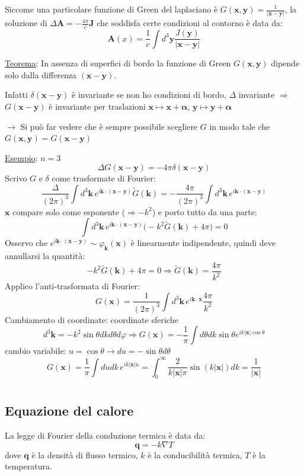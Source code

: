 \documentclass[a4paper,11pt]{report}
\newcommand{\vect}[1]{\boldsymbol{#1}}
\newcommand{\x}{\boldsymbol{x}}
\newcommand{\y}{\boldsymbol{y}}
\newcommand{\kk}{\boldsymbol{k}}
\begin{document}
Siccome una particolare funzione di Green del laplaciano \`e $G(\x,\y)=\frac{1}{|\x-\y|}$, la soluzione di $\Delta \vect{A}=-\frac{4 \pi}{c} \vect{J}$ che soddisfa certe condizioni al contorno \`e data da:
\[
\vect{A}(x)=\frac{1}{c} \int d^3 \y \frac{J(\y)}{|\x-\y|}
\]

\medskip

\underline{Teorema}: In assenza di superfici di bordo la funzione di Green $G(\x,\y)$ dipende solo dalla differenza $(\x-\y)$.

Infatti $\delta(\x-\y)$ \`e invariante se non ho condizioni di bordo, $\Delta$ invariante $\Rightarrow$ $G(\x-\y)$ \`e invariante per traslazioni $\x \mapsto \x+\vect{\alpha}$, $\y \mapsto \y+\vect{\alpha}$

$\rightarrow$ Si pu\`o far vedere che \`e sempre possibile scegliere $G$ in modo tale che $G(\x,\y)=G(\x-\y)$

\medskip

\underline{Esempio}: $n=3$
\[
\Delta G(\x-\y)=-4\pi\delta(\x-\y)
\]
Scrivo $G$ e $\delta$ come trasformate di Fourier:
\[
\frac{\Delta}{(2\pi)^3}\int d^3\kk \,e^{i\kk\cdot(\x-\y)}\tilde{G}(\kk)=-\frac{4\pi}{(2\pi)^3}\int d^3\kk\, e^{i\kk\cdot(\x-\y)}
\]
$\x$ compare solo come esponente ($\Rightarrow -k^2$) e porto tutto da una parte:
\[
\int d^3\kk\, e^{i\kk\cdot(\x-\y)}\big(-k^2\tilde{G}(\kk)+4\pi \big)=0
\]
Osservo che $e^{i\kk\cdot(\x-\y)}\sim\varphi_{\kk}(\x)$ \`e linearmente indipendente, quindi deve annullarsi la quantit\`a:
\[
-k^2\tilde{G}(\kk)+4\pi =0 \Rightarrow \tilde{G}(\kk)=\frac{4\pi}{k^2}
\]
Applico l'anti-trasformata di Fourier:
\[
G(\x)=\frac{1}{(2\pi)^3}\int d^3\kk\, e^{i\kk\cdot\x}\frac{4\pi}{k^2}
\]
Cambiamento di coordinate: coordinate sferiche
\[
d^3\kk=-k^2\sin\theta dk d\theta d\varphi \Rightarrow G(\x)=-\frac{1}{\pi}\int d\theta dk \sin\theta e^{ik|\x|\cos\theta}
\]
cambio variabile: $u=\cos\theta \rightarrow du=-\sin\theta d\theta$
\[
G(\x)=\frac{1}{\pi}\int du dk \, e^{ik|\x|u}=\int_0^{\infty}\frac{2}{k|\x|\pi}\sin(k|\x|)dk= \frac{1}{|\x|}
\]

\chapter{}

\section{Equazione del calore}

La legge di Fourier della conduzione termica \`e data da:
\begin{equation}
\vect{q} =-k\nabla T
\label{2.1}
\end{equation}
dove $\vect{q}$ \`e la densit\`a di flusso termico, $k$ \`e la conducibilit\`a termica, $T$ \`e la temperatura.
\end{document}
